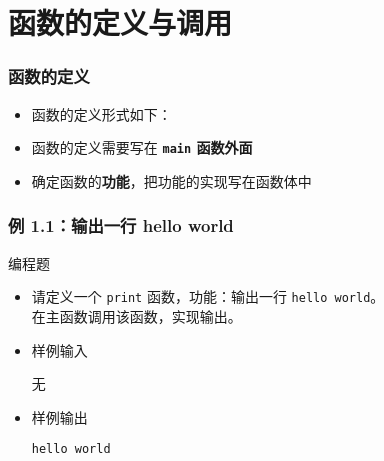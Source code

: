 \section{函数的定义与调用}

\begin{frame}[fragile]
    \frametitle{函数的定义}

    \begin{itemize}
        \item<1-> 函数的定义形式如下：
        \item<2-> 函数的定义需要写在 \textbf{\lstinline|main| 函数外面}
        \item<3-> 确定函数的\textbf{功能}，把功能的实现写在函数体中
    \end{itemize}
\end{frame}

\begin{frame}[fragile]
    \frametitle{例 1.1：输出一行 hello world}
        \begin{exampleblock}{编程题}

            \begin{itemize}
                \item 请定义一个 \lstinline|print| 函数，功能：输出一行 \lstinline|hello world|。\\
                    在主函数调用该函数，实现输出。

                \item 样例输入

                    无

                \item 样例输出

                    \lstinline|hello world|

            \end{itemize}

        \end{exampleblock}
\end{frame}

